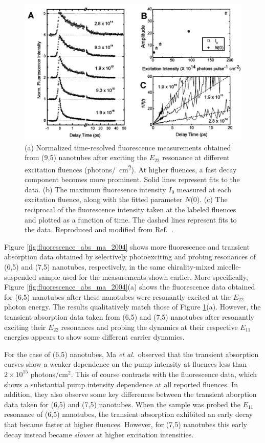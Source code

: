 \begin{figure}[H]
	\centering
	\includegraphics[scale=0.35]{images/chapter_prior_works/fluorescence_2_ma_2004}
	\caption{(a) Normalized time-resolved fluorescence measurements obtained from (9,5) nanotubes after exciting the $E_{22}$ resonance at different excitation fluences (photons\si{/\cm \squared}). At higher fluences, a fast decay component becomes more prominent. Solid lines represent fits to the data. (b) The maximum fluoresence intensity $I_0$ measured at each excitation fluence, along with the fitted parameter $N$(0). (c) The reciprocal of the fluorescence intensity taken at the labeled fluences and plotted as a function of time. The dashed lines represent fits to the data. Reproduced and modified from Ref.\ \cite{ma2004ultrafast}.}
	\label{fig:fluorescence_ma_2004}
\end{figure}

Figure \ref{fig:fluorescence_abs_ma_2004} shows more fluorescence and transient absorption data obtained by selectively photoexciting and probing resonances of (6,5) and (7,5) nanotubes, respectively, in the same chirality-mixed micelle-suspended sample used for the measurements shown earlier. More specifically, Figure \ref{fig:fluorescence_abs_ma_2004}(a) shows the fluorescence data obtained for (6,5) nanotubes after these nanotubes were resonantly excited at the $E_{22}$ photon energy. The results qualitatively match those of Figure \ref{fig:fluorescence_ma_2004}(a). However, the transient absorption data taken from (6,5) and (7,5) nanotubes after resonantly exciting their $E_{22}$ resonances and probing the dynamics at their respective $E_{11}$ energies appears to show some different carrier dynamics.

For the case of (6,5) nanotubes, Ma \textit{et al}.\ observed that the transient absorption curves show a weaker dependence on the pump intensity at fluences less than $2 \times 10^{15}$ photons/cm$^2$. This of course contrasts with the fluorescence data, which shows a substantial pump intensity dependence at all reported fluences. In addition, they also observe some key differences between the transient aborption data taken for (6,5) and (7,5) nanotubes. When the sample was probed the $E_{11}$ resonance of (6,5) nanotubes, the transient absorption exhibited an early decay that became faster at higher fluences. However, for (7,5) nanotubes this early decay instead became \textit{slower} at higher excitation intensities.


